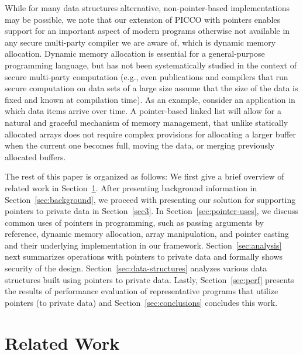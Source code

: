 \documentclass[11pt]{article}
\begin{document}
While for many data structures alternative, non-pointer-based
implementations may be possible, we note that our extension of PICCO with
pointers enables support for an important aspect of modern programs
otherwise not available in any secure multi-party compiler we are aware of,
which is dynamic memory allocation. Dynamic memory allocation is essential
for a general-purpose programming language, but has not been systematically
studied in the context of secure multi-party computation (e.g., even
publications and compilers that run secure computation on data sets of a
large size assume that the size of the data is fixed and known at
compilation time). As an example, consider an application in which data
items arrive over time. A pointer-based linked list will allow for a natural
and graceful mechanism of memory management, that unlike statically
allocated arrays does not require complex provisions for allocating a larger
buffer when the current one becomes full, moving the data, or merging
previously allocated buffers.

The rest of this paper is organized as follows: We first give a brief
overview of related work in Section~\ref{sec:rel-work}. After presenting
background information in Section~\ref{sec:background}, we proceed with
presenting our solution for supporting pointers to private data in
Section~\ref{sec3}. In Section~\ref{sec:pointer-uses}, we discuss common
uses of pointers in programming, such as passing arguments by reference,
dynamic memory allocation, array manipulation, and pointer casting and their
underlying implementation in our framework. Section~\ref{sec:analysis} next
summarizes operations with pointers to private data and formally shows
security of the design. Section~\ref{sec:data-structures} analyzes various
data structures built using pointers to private data. Lastly,
Section~\ref{sec:perf} presents the results of performance evaluation of
representative programs that utilize pointers (to private data) and
Section~\ref{sec:conclusions} concludes this work.

\section{Related Work}
\label{sec:rel-work}
\end{document}
